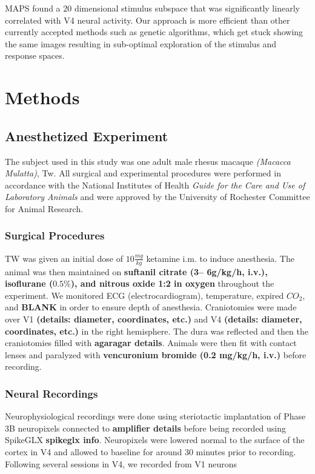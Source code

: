 MAPS found a 20 dimensional stimulus subspace that was significantly linearly correlated with V4 neural activity. Our approach is more efficient than other currently accepted methods such as genetic algorithms, which get stuck showing the same images resulting in sub-optimal exploration of the stimulus and response spaces.

\section{Methods}

\subsection{Anesthetized Experiment}
The subject used in this study was one adult male rhesus macaque \textit{(Macacca Mulatta)}, Tw. All surgical and experimental procedures were performed in accordance with the National Institutes of Health \textit{Guide for the Care and Use of Laboratory Animals} \parencite{guide} and were approved by the University of Rochester Committee for Animal Research.

\subsubsection*{Surgical Procedures}
TW was given an initial dose of \textbf{$10 \frac{mg}{kg}$} ketamine i.m. to induce anesthesia. The animal was then maintained on \textbf{suftanil citrate (3– 6g/kg/h, i.v.), isoflurane ($0.5\%$), and nitrous oxide 1:2 in oxygen} throughout the experiment. We monitored ECG (electrocardiogram), temperature, expired $CO_2$, and \textbf{BLANK} in order to ensure depth of anesthesia. Craniotomies were made over V1 \textbf{(details: diameter, coordinates, etc.)} and V4 \textbf{(details: diameter, coordinates, etc.)} in the right hemisphere. The dura was reflected and then the craniotomies filled with \textbf{agaragar details}. Animals were then fit with contact lenses and paralyzed with \textbf{vencuronium bromide (0.2 mg/kg/h, i.v.)} before recording.

\subsubsection*{Neural Recordings}
Neurophysiological recordings were done using steriotactic implantation of Phase 3B neuropixels \parencite{Jun2017} connected to \textbf{amplifier details} before being recorded using SpikeGLX \textbf{spikeglx info}. Neuropixels were lowered normal to the surface of the cortex in V4 and allowed to baseline for around 30 minutes prior to recording. Following several sessions in V4, we recorded from V1 neurons 

